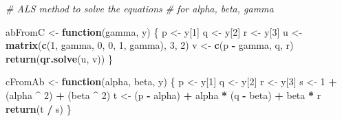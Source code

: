 \documentclass[
  12pt,
]{article}
\newenvironment{Shaded}{\begin{snugshade}}{\end{snugshade}}
\newcommand{\CommentTok}[1]{\textcolor[rgb]{0.56,0.35,0.01}{\textit{#1}}}
\newcommand{\ControlFlowTok}[1]{\textcolor[rgb]{0.13,0.29,0.53}{\textbf{#1}}}
\newcommand{\DecValTok}[1]{\textcolor[rgb]{0.00,0.00,0.81}{#1}}
\newcommand{\FunctionTok}[1]{\textcolor[rgb]{0.13,0.29,0.53}{\textbf{#1}}}
\newcommand{\NormalTok}[1]{#1}
\newcommand{\OtherTok}[1]{\textcolor[rgb]{0.56,0.35,0.01}{#1}}
\newcommand{\SpecialCharTok}[1]{\textcolor[rgb]{0.81,0.36,0.00}{\textbf{#1}}}
\begin{document}
\begin{Shaded}
\begin{Highlighting}[]
\CommentTok{\# ALS method to solve the equations}
\CommentTok{\# for alpha, beta, gamma}

\NormalTok{abFromC }\OtherTok{\textless{}{-}} \ControlFlowTok{function}\NormalTok{(gamma, y) \{}
\NormalTok{  p }\OtherTok{\textless{}{-}}\NormalTok{ y[}\DecValTok{1}\NormalTok{]}
\NormalTok{  q }\OtherTok{\textless{}{-}}\NormalTok{ y[}\DecValTok{2}\NormalTok{]}
\NormalTok{  r }\OtherTok{\textless{}{-}}\NormalTok{ y[}\DecValTok{3}\NormalTok{]}
\NormalTok{  u }\OtherTok{\textless{}{-}} \FunctionTok{matrix}\NormalTok{(}\FunctionTok{c}\NormalTok{(}\DecValTok{1}\NormalTok{, gamma, }\DecValTok{0}\NormalTok{, }\DecValTok{0}\NormalTok{, }\DecValTok{1}\NormalTok{, gamma), }\DecValTok{3}\NormalTok{, }\DecValTok{2}\NormalTok{)}
\NormalTok{  v }\OtherTok{\textless{}{-}} \FunctionTok{c}\NormalTok{(p }\SpecialCharTok{{-}}\NormalTok{ gamma, q, r)}
  \FunctionTok{return}\NormalTok{(}\FunctionTok{qr.solve}\NormalTok{(u, v))}
\NormalTok{\}}

\NormalTok{cFromAb }\OtherTok{\textless{}{-}} \ControlFlowTok{function}\NormalTok{(alpha, beta, y) \{}
\NormalTok{  p }\OtherTok{\textless{}{-}}\NormalTok{ y[}\DecValTok{1}\NormalTok{]}
\NormalTok{  q }\OtherTok{\textless{}{-}}\NormalTok{ y[}\DecValTok{2}\NormalTok{]}
\NormalTok{  r }\OtherTok{\textless{}{-}}\NormalTok{ y[}\DecValTok{3}\NormalTok{]}
\NormalTok{  s }\OtherTok{\textless{}{-}} \DecValTok{1} \SpecialCharTok{+}\NormalTok{ (alpha }\SpecialCharTok{\^{}} \DecValTok{2}\NormalTok{) }\SpecialCharTok{+}\NormalTok{ (beta }\SpecialCharTok{\^{}} \DecValTok{2}\NormalTok{)}
\NormalTok{  t }\OtherTok{\textless{}{-}}\NormalTok{ (p }\SpecialCharTok{{-}}\NormalTok{ alpha) }\SpecialCharTok{+}\NormalTok{ alpha }\SpecialCharTok{*}\NormalTok{ (q }\SpecialCharTok{{-}}\NormalTok{ beta) }\SpecialCharTok{+}\NormalTok{ beta }\SpecialCharTok{*}\NormalTok{ r}
  \FunctionTok{return}\NormalTok{(t }\SpecialCharTok{/}\NormalTok{ s)}
\NormalTok{\}}



\end{Highlighting}
\end{Shaded}
\end{document}
